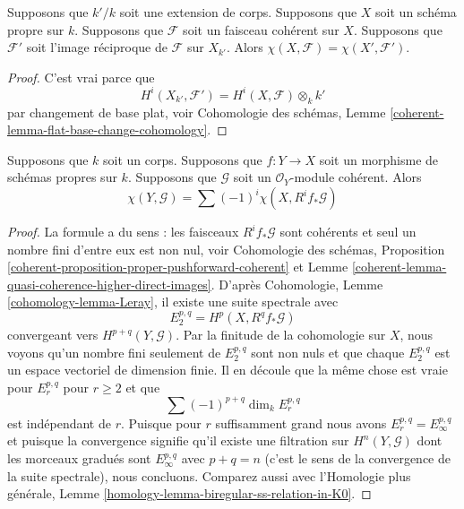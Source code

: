 \begin{lemma}
\label{lemma-euler-characteristic-extend-base-field}
Supposons que $k'/k$ soit une extension de corps. Supposons que $X$ soit un
schéma propre sur $k$. Supposons que $\mathcal{F}$ soit un faisceau
cohérent sur $X$. Supposons que $\mathcal{F}'$ soit l'image réciproque de
$\mathcal{F}$ sur $X_{k'}$. Alors $\chi(X, \mathcal{F}) = \chi(X', \mathcal{F}')$.
\end{lemma}

\begin{proof}
C'est vrai parce que
$$
H^i(X_{k'}, \mathcal{F}') = H^i(X, \mathcal{F}) \otimes_k k'
$$
par changement de base plat, voir Cohomologie des
schémas, Lemme \ref{coherent-lemma-flat-base-change-cohomology}.
\end{proof}

\begin{lemma}
\label{lemma-euler-characteristic-morphism}
Supposons que $k$ soit un corps. Supposons que $f : Y \to X$ soit un morphisme de schémas
propres sur $k$. Supposons que $\mathcal{G}$ soit un $\mathcal{O}_Y$-module cohérent. Alors
$$
\chi(Y, \mathcal{G}) = \sum (-1)^i \chi(X, R^if_*\mathcal{G})
$$
\end{lemma}

\begin{proof}
La formule a du sens : les faisceaux
$R^if_*\mathcal{G}$ sont cohérents et seul un nombre
fini d'entre eux est non nul, voir Cohomologie des
schémas, Proposition
\ref{coherent-proposition-proper-pushforward-coherent} et Lemme
\ref{coherent-lemma-quasi-coherence-higher-direct-images}. D'après
Cohomologie, Lemme \ref{cohomology-lemma-Leray}, il existe une suite spectrale avec
$$
E_2^{p, q} = H^p(X, R^qf_*\mathcal{G})
$$
convergeant vers $H^{p + q}(Y, \mathcal{G})$. Par la finitude de la
cohomologie sur $X$, nous voyons qu’un nombre fini seulement de $E_2^{p, q}$ sont
non nuls et que chaque $E_2^{p, q}$ est un espace vectoriel de dimension finie.
Il en découle que la même chose est vraie pour $E_r^{p, q}$ pour $r \geq 2$ et que
$$
\sum (-1)^{p + q} \dim_k E_r^{p, q}
$$
est indépendant de $r$. Puisque pour $r$ suffisamment grand
nous avons $E_r^{p, q} = E_\infty^{p, q}$ et puisque la
convergence signifie qu'il existe une filtration sur $H^n(Y,
\mathcal{G})$ dont les morceaux gradués sont $E_\infty^{p, q}$
avec $p + q = n$ (c'est le sens de la convergence de la suite
spectrale), nous concluons. Comparez aussi avec l'Homologie plus
générale, Lemme \ref{homology-lemma-biregular-ss-relation-in-K0}.
\end{proof}








